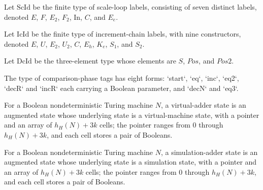 \begin{definition}
\label{Complexity.Codec.ScId}
\leanok
Let $\mathrm{ScId}$ be the finite type of scale-loop labels, consisting of seven distinct
labels, denoted $E$, $F$, $E_2$, $F_2$, $\mathrm{In}$, $C$, and $E_e$.
\end{definition}

\begin{definition}
\label{Complexity.Codec.IcId}
\leanok
Let $\mathrm{IcId}$ be the finite type of increment-chain labels, with nine constructors,
denoted $E$, $U$, $E_2$, $U_2$, $C$, $E_h$, $K_e$, $S_1$, and $S_2$.
\end{definition}

\begin{definition}
\label{Complexity.Codec.DcId}
\leanok
Let $\mathrm{DcId}$ be the three-element type whose elements are $S$, $Pos$, and $Pos2$.
\end{definition}

\begin{definition}
\label{Complexity.Codec.PmPh}
\leanok
The type of comparison-phase tags has eight forms: `start`, `eq`, `inc`, `eq2`, `decR`
and `incR` each carrying a Boolean parameter, and `decN` and `eq3`.
\end{definition}

\begin{definition}
\label{Complexity.Codec.VAd}
\leanok
{}
For a Boolean nondeterministic Turing machine $N$, a virtual-adder state is an augmented
state whose underlying state is a virtual-machine state, with a pointer and an array of
$h_H(N)+3k$ cells; the pointer ranges from $0$ through $h_H(N)+3k$, and each cell stores
a pair of Booleans.
\end{definition}

\begin{definition}
\label{Complexity.Codec.SAd}
\leanok
{}
For a Boolean nondeterministic Turing machine $N$, a simulation-adder state is an
augmented state whose underlying state is a simulation state, with a pointer and an
array of $h_H(N)+3k$ cells; the pointer ranges from $0$ through $h_H(N)+3k$, and each
cell stores a pair of Booleans.
\end{definition}

